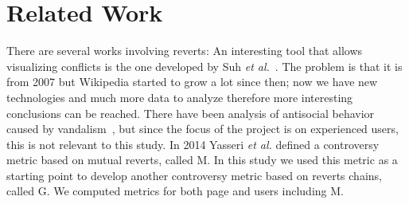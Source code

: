 \section{Related Work}
There are several works involving reverts: An interesting tool that allows visualizing conflicts is
the one developed by Suh \textit{et al.}~\cite{Suh2007}. The problem is that it is from 2007 but
Wikipedia started to grow a lot since then; now we have new technologies and much more data to
analyze therefore more interesting conclusions can be reached. There have been analysis of antisocial
behavior caused by vandalism~\cite{Kiesel2017}, but since the focus of the project is on experienced
users, this is not relevant to this study. In 2014 Yasseri \textit{et al.}\cite{Yasseri2014}
defined a controversy metric based on mutual reverts, called M. In this study we used this metric as a starting
point to develop another controversy metric based on reverts chains, called G. We computed metrics for both
page and users including M.